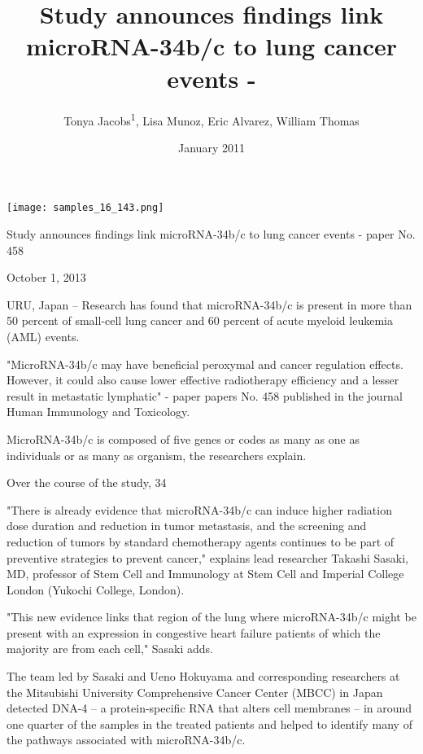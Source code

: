 \documentclass{article}
\title{Study announces findings link microRNA-34b/c to lung cancer events -}
\author{Tonya Jacobs\textsuperscript{1},  Lisa Munoz,  Eric Alvarez,  William Thomas}
\affil{\textsuperscript{1}Fudan University}
\date{January 2011}
\begin{document}
\maketitle

\begin{center}
\begin{minipage}{0.75\linewidth}
\texttt{[image: samples\_16\_143.png]}
\end{minipage}
\end{center}

Study announces findings link microRNA-34b/c to lung cancer events - paper No. 458

October 1, 2013

URU, Japan -- Research has found that microRNA-34b/c is present in more than 50 percent of small-cell lung cancer and 60 percent of acute myeloid leukemia (AML) events.

"MicroRNA-34b/c may have beneficial peroxymal and cancer regulation effects. However, it could also cause lower effective radiotherapy efficiency and a lesser result in metastatic lymphatic" - paper papers No. 458 published in the journal Human Immunology and Toxicology.

MicroRNA-34b/c is composed of five genes or codes as many as one as individuals or as many as organism, the researchers explain.

Over the course of the study, 34%

"There is already evidence that microRNA-34b/c can induce higher radiation dose duration and reduction in tumor metastasis, and the screening and reduction of tumors by standard chemotherapy agents continues to be part of preventive strategies to prevent cancer," explains lead researcher Takashi Sasaki, MD, professor of Stem Cell and Immunology at Stem Cell and Imperial College London (Yukochi College, London).

"This new evidence links that region of the lung where microRNA-34b/c might be present with an expression in congestive heart failure patients of which the majority are from each cell," Sasaki adds.

The team led by Sasaki and Ueno Hokuyama and corresponding researchers at the Mitsubishi University Comprehensive Cancer Center (MBCC) in Japan detected DNA-4 -- a protein-specific RNA that alters cell membranes -- in around one quarter of the samples in the treated patients and helped to identify many of the pathways associated with microRNA-34b/c.
\end{document}
